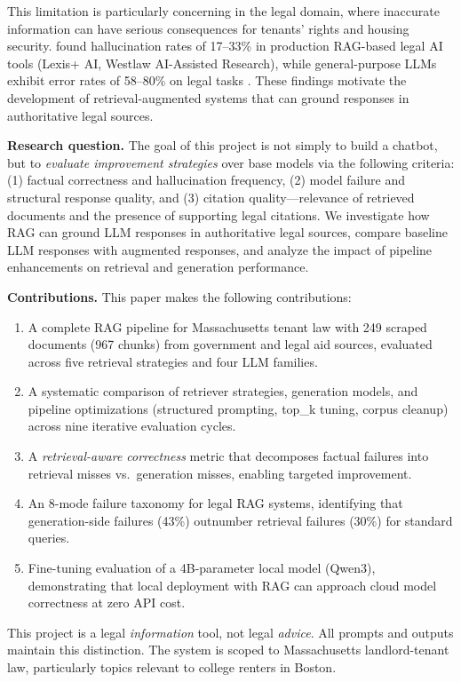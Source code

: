\documentclass{article}
\begin{document}
This limitation is particularly concerning in the legal domain, where inaccurate information can have serious consequences for tenants' rights and housing security. \citet{magesh2025hallucination} found hallucination rates of 17--33\% in production RAG-based legal AI tools (Lexis+ AI, Westlaw AI-Assisted Research), while general-purpose LLMs exhibit error rates of 58--80\% on legal tasks \citep{rag_legal_survey_2025}. These findings motivate the development of retrieval-augmented systems that can ground responses in authoritative legal sources.

\textbf{Research question.} The goal of this project is not simply to build a chatbot, but to \emph{evaluate improvement strategies} over base models via the following criteria: (1) factual correctness and hallucination frequency, (2) model failure and structural response quality, and (3) citation quality---relevance of retrieved documents and the presence of supporting legal citations. We investigate how RAG can ground LLM responses in authoritative legal sources, compare baseline LLM responses with augmented responses, and analyze the impact of pipeline enhancements on retrieval and generation performance.

\textbf{Contributions.} This paper makes the following contributions:
\begin{enumerate}
    \item A complete RAG pipeline for Massachusetts tenant law with 249 scraped documents (967 chunks) from government and legal aid sources, evaluated across five retrieval strategies and four LLM families.
    \item A systematic comparison of retriever strategies, generation models, and pipeline optimizations (structured prompting, top\_k tuning, corpus cleanup) across nine iterative evaluation cycles.
    \item A \emph{retrieval-aware correctness} metric that decomposes factual failures into retrieval misses vs.\ generation misses, enabling targeted improvement.
    \item An 8-mode failure taxonomy for legal RAG systems, identifying that generation-side failures (43\%) outnumber retrieval failures (30\%) for standard queries.
    \item Fine-tuning evaluation of a 4B-parameter local model (Qwen3), demonstrating that local deployment with RAG can approach cloud model correctness at zero API cost.
\end{enumerate}

This project is a legal \emph{information} tool, not legal \emph{advice}. All prompts and outputs maintain this distinction. The system is scoped to Massachusetts landlord-tenant law, particularly topics relevant to college renters in Boston.
\end{document}
